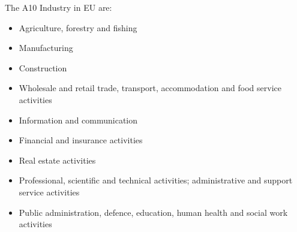 \newpage
The A10 Industry in EU are:
\begin{itemize}
\item Agriculture, forestry and fishing
\item Manufacturing
\item Construction
\item Wholesale and retail trade, transport, accommodation and food service activities
\item Information and communication
\item Financial and insurance activities
\item Real estate activities
\item Professional, scientific and technical activities; administrative and support service activities
\item Public administration, defence, education, human health and social work activities
\end{itemize}
